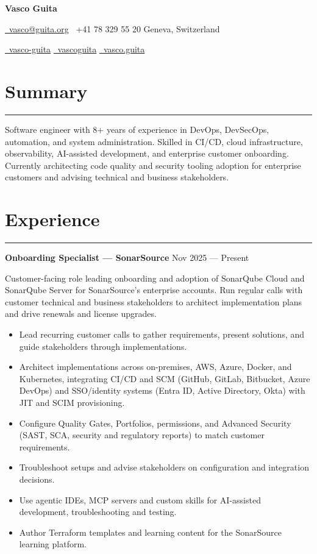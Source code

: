 \documentclass[11pt,a4paper]{article}
\begin{document}
\begin{center}
  {\huge \textbf{Vasco Guita}}

  \bigskip

  \href{mailto:vasco@guita.org}{\faAt\ vasco@guita.org}
  \quad
  \faPhone\ +41 78 329 55 20
  \quad
  \faMapMarker* Geneva, Switzerland

  \href{https://www.linkedin.com/in/vasco-guita}{\faLinkedin\ vasco-guita}
  \quad
  \href{https://github.com/vascoguita}{\faGithub\ vascoguita}
  \quad
  \href{https://gitlab.com/vasco.guita}{\faGitlab\ vasco.guita}
\end{center}

\bigskip

\section*{Summary}

\hrule

Software engineer with 8+ years of experience in DevOps, DevSecOps, automation,
and system administration. Skilled in CI/CD, cloud infrastructure,
observability, AI-assisted development, and enterprise customer onboarding.
Currently architecting code quality and security tooling adoption for
enterprise customers and advising technical and business stakeholders.

\section*{Experience}

\hrule

\textbf{Onboarding Specialist --- SonarSource}
\hfill
Nov 2025 --- Present

Customer-facing role leading onboarding and adoption of SonarQube Cloud and
SonarQube Server for SonarSource's enterprise accounts. Run regular calls with
customer technical and business stakeholders to architect implementation plans
and drive renewals and license upgrades.

\begin{itemize}[noitemsep]
  \item Lead recurring customer calls to gather requirements, present
  solutions, and guide stakeholders through implementations.
  \item Architect implementations across on-premises, AWS, Azure, Docker, and
  Kubernetes, integrating CI/CD and SCM (GitHub, GitLab, Bitbucket, Azure
  DevOps) and SSO/identity systems (Entra ID, Active Directory, Okta) with JIT
  and SCIM provisioning.
  \item Configure Quality Gates, Portfolios, permissions, and Advanced
  Security (SAST, SCA, security and regulatory reports) to match customer
  requirements.
  \item Troubleshoot setups and advise stakeholders on configuration and
  integration decisions.
  \item Use agentic IDEs, MCP servers and custom skills for AI-assisted
  development, troubleshooting and testing.
  \item Author Terraform templates and learning content for the SonarSource
  learning platform.
\end{itemize}
\end{document}

